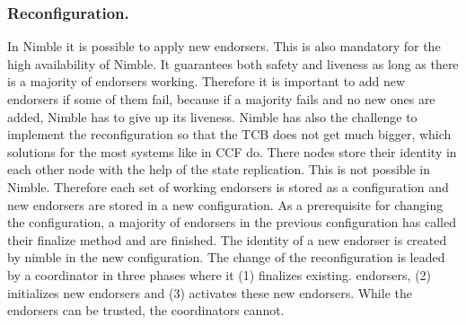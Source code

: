 	\subsubsection*{Reconfiguration.}
	In Nimble it is possible to apply new endorsers. This is also mandatory for the high availability of Nimble. It guarantees both safety and liveness as long as there is a majority of endorsers working. Therefore it is important to add new endorsers if some of them fail, because if a majority fails and no new ones are added, Nimble has to give up its liveness. Nimble has also the challenge to implement the reconfiguration so that the TCB does not get much bigger, which solutions for the most systems like in CCF do. There nodes store their identity in each other node with the help of the state replication. This is not possible in Nimble. Therefore each set of working endorsers is stored as a configuration and new endorsers are stored in a new configuration. As a prerequisite for changing the configuration, a majority of endorsers in the previous configuration has called their finalize method and are finished. The identity of a new endorser is created by nimble in the new configuration. The change of the reconfiguration is leaded by a coordinator in three phases where it (1) finalizes existing. endorsers, (2) initializes new endorsers and (3) activates these new endorsers. While the endorsers can be trusted, the coordinators cannot. 

